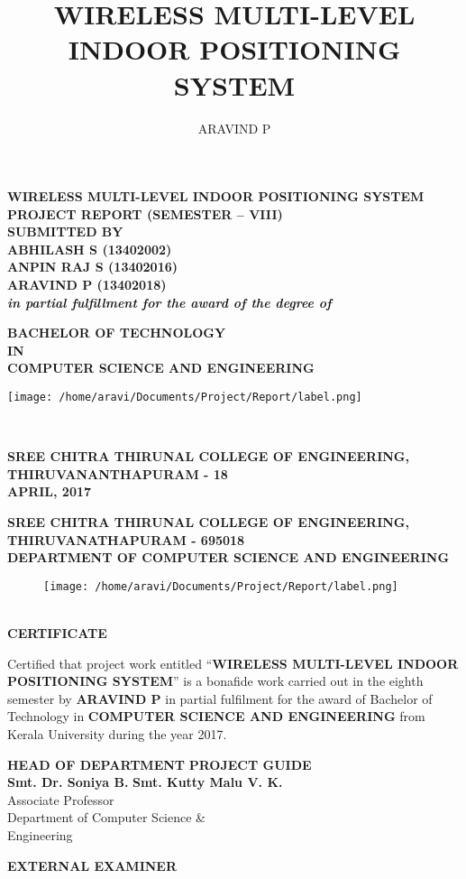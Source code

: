 \documentclass[a4paper,12pt]{report}
\title{WIRELESS MULTI-LEVEL INDOOR POSITIONING SYSTEM}
\author{ARAVIND P}
\newcommand*{\plogo}{
    \texttt{[image: /home/aravi/Documents/Project/Report/label.png]} %
    \iffalse
      \texttt{[image: /home/aravi/Documents/Project/Report/label.png]} %
    \fi
}
\newcommand*{\titleGP}{\begingroup %
\centering %
\vspace*{-25pt} %

\textbf{
{\LARGE WIRELESS MULTI-LEVEL INDOOR POSITIONING SYSTEM}\\[\baselineskip] %
}
\textbf{PROJECT REPORT (SEMESTER – VIII)}\\
[\baselineskip]
\textbf{SUBMITTED BY}\\
[\baselineskip]
\textbf{ABHILASH S (13402002)}\\
\textbf{ANPIN RAJ S (13402016)}\\
\textbf{ARAVIND P (13402018)}\\
[\baselineskip]
\textbf{\textit{in partial fulfillment for the award of the degree of}}\\
[\baselineskip]



{\Large \textbf{BACHELOR OF TECHNOLOGY} \\ \textbf{IN} \\ \textbf{COMPUTER SCIENCE AND ENGINEERING}\\ \par} %


\vspace*{1cm}%

\plogo \\[0.1\baselineskip] %

\vspace*{1cm}

{\large \textbf{SREE CHITRA THIRUNAL COLLEGE OF ENGINEERING,}\\
\textbf{THIRUVANANTHAPURAM - 18}\\
\textbf{APRIL, 2017}\\[\baselineskip]}\par %
\newpage
\endgroup}
\begin{document}
 

\pagestyle{empty} %
\titleGP %


\begin{center}
  \textbf{\large SREE CHITRA THIRUNAL COLLEGE OF ENGINEERING,}\\
  
  \textbf{THIRUVANATHAPURAM - 695018}\\

  \textbf{DEPARTMENT OF COMPUTER SCIENCE AND ENGINEERING}
  \newline
  \begin{figure}[h!]
    \begin{center}
    	\plogo
    \end{center}
  \end{figure}
  \\[0.3\baselineskip]
  
  \Large \textbf{CERTIFICATE}\\
  [\baselineskip]
  \end{center}
  \par 
  Certified that project work entitled “\textbf{WIRELESS MULTI-LEVEL INDOOR POSITIONING SYSTEM}” is a bonafide work carried out in the eighth semester by \textbf{ARAVIND P} in partial fulfilment for the award of Bachelor of Technology in \textbf{COMPUTER SCIENCE AND ENGINEERING} from Kerala University during the year 2017.

  \vspace{2cm}
  
  \begin{flushleft}
  	\textbf{HEAD OF DEPARTMENT} \hspace{3.5cm}\textbf{PROJECT GUIDE} \\
  	\textbf{Smt. Dr. Soniya B.} \hspace{5.25cm}\textbf{Smt. Kutty Malu V. K. } \\
  	{Associate Professor} \hspace{5.8cm}{Assistant Professor} \\
  	{Department of Computer Science \& \hspace{2.8cm}{Department of Computer Science \&}} \\
  	{Engineering} \hspace{7.15cm}{Engineering}
  \end{flushleft}
  
  \vspace{2cm}
  
  \begin{center}
	  \textbf{EXTERNAL EXAMINER}
  \end{center}
\end{document}
